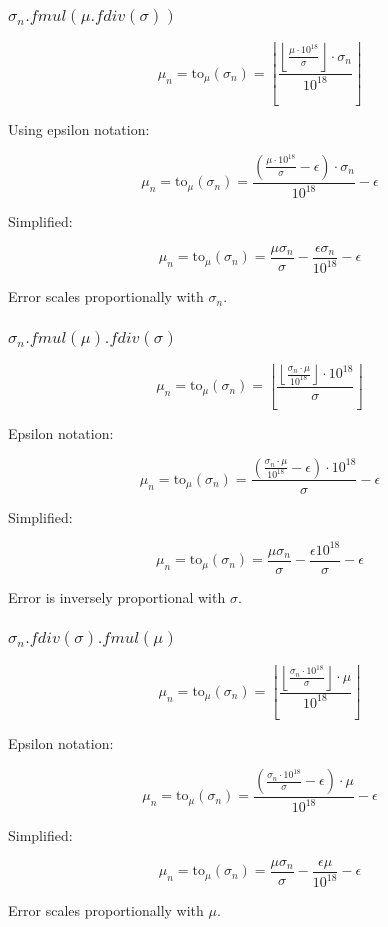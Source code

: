 \documentclass{article}
\begin{document}
\subsubsection{$\sigma_n.fmul(\mu.fdiv(\sigma))$}

$$ \mu_n = \mbox{to}_\mu(\sigma_n) = \left\lfloor\frac{\left\lfloor\frac{\mu \cdot 10^{18}}{\sigma}\right\rfloor \cdot \sigma_n}{10^{18}}\right\rfloor $$

Using epsilon notation:

$$ \mu_n = \mbox{to}_\mu(\sigma_n) = \frac{(\frac{\mu \cdot 10^{18}}{\sigma} - \epsilon) \cdot \sigma_n}{10^{18}} - \epsilon $$

Simplified:

$$ \mu_n = \mbox{to}_\mu(\sigma_n) = \frac{\mu\sigma_n}{\sigma} - \frac{\epsilon\sigma_n}{10^{18}} - \epsilon $$

Error scales proportionally with $\sigma_n$.

\subsubsection{$\sigma_n.fmul(\mu).fdiv(\sigma)$}

$$ \mu_n = \mbox{to}_\mu(\sigma_n) = \left\lfloor\frac{\left\lfloor\frac{\sigma_n \cdot \mu}{10^{18}}\right\rfloor \cdot 10^{18}}{\sigma}\right\rfloor $$

Epsilon notation:

$$ \mu_n = \mbox{to}_\mu(\sigma_n) = \frac{\left(\frac{\sigma_n \cdot \mu}{10^{18}} - \epsilon\right) \cdot 10^{18}}{\sigma} - \epsilon $$

Simplified:

$$ \mu_n = \mbox{to}_\mu(\sigma_n) = \frac{\mu\sigma_n}{\sigma} - \frac{\epsilon10^{18}}{\sigma} - \epsilon$$

Error is inversely proportional with $\sigma$.

\subsubsection{$\sigma_n.fdiv(\sigma).fmul(\mu)$}

$$ \mu_n = \mbox{to}_\mu(\sigma_n) = \left\lfloor\frac{\left\lfloor\frac{\sigma_n \cdot 10^{18}}{\sigma}\right\rfloor \cdot \mu}{10^{18}}\right\rfloor $$

Epsilon notation:

$$ \mu_n = \mbox{to}_\mu(\sigma_n) = \frac{\left(\frac{\sigma_n \cdot 10^{18}}{\sigma} - \epsilon\right) \cdot \mu}{10^{18}} - \epsilon $$

Simplified: 

$$ \mu_n = \mbox{to}_\mu(\sigma_n) = \frac{\mu\sigma_n}{\sigma} - \frac{\epsilon\mu}{10^{18}} - \epsilon $$

Error scales proportionally with $\mu$.
\end{document}
